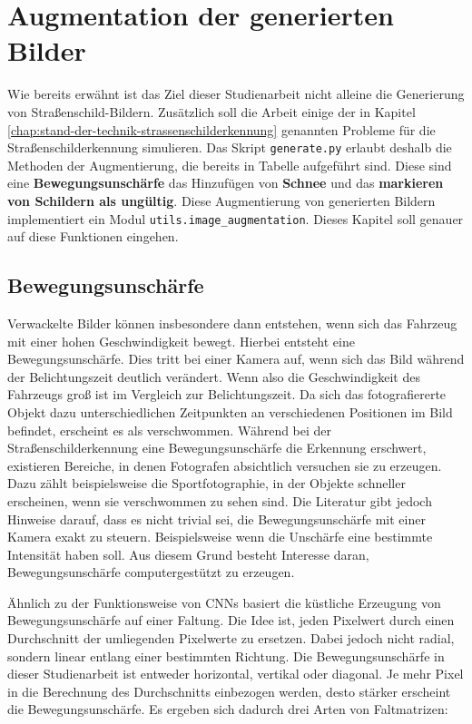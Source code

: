 \chapter{Augmentation der generierten Bilder}
\label{chap:5}

Wie bereits erwähnt ist das Ziel dieser Studienarbeit nicht alleine die Generierung von Straßenschild-Bildern. Zusätzlich soll die Arbeit einige der in Kapitel \ref{chap:stand-der-technik-strassenschilderkennung} genannten Probleme für die Straßenschilderkennung simulieren. Das Skript \texttt{generate.py} erlaubt deshalb die Methoden der Augmentierung, die bereits in Tabelle \label{tab:generate-cli} aufgeführt sind. Diese sind eine \textbf{Bewegungsunschärfe} das Hinzufügen von \textbf{Schnee} und das \textbf{markieren von Schildern als ungültig}. Diese Augmentierung von generierten Bildern implementiert ein Modul \texttt{utils.image_augmentation}. Dieses Kapitel soll genauer auf diese Funktionen eingehen.

\section{Bewegungsunschärfe}
Verwackelte Bilder können insbesondere dann entstehen, wenn sich das Fahrzeug mit einer hohen Geschwindigkeit bewegt. Hierbei entsteht eine Bewegungsunschärfe. Dies tritt bei einer Kamera auf, wenn sich das Bild während der Belichtungszeit deutlich verändert. Wenn also die Geschwindigkeit des Fahrzeugs groß ist im Vergleich zur Belichtungszeit. Da sich das fotografiererte Objekt dazu unterschiedlichen Zeitpunkten an verschiedenen Positionen im Bild befindet, erscheint es als verschwommen. Während bei der Straßenschilderkennung eine Bewegungsunschärfe die Erkennung erschwert, existieren Bereiche, in denen Fotografen absichtlich versuchen sie zu erzeugen. Dazu zählt beispielsweise die Sportfotographie, in der Objekte schneller erscheinen, wenn sie verschwommen zu sehen sind. Die Literatur gibt jedoch Hinweise darauf, dass es nicht trivial sei, die Bewegungsunschärfe mit einer Kamera exakt zu steuern. Beispielsweise wenn die Unschärfe eine bestimmte Intensität haben soll. Aus diesem Grund besteht Interesse daran, Bewegungsunschärfe computergestützt zu erzeugen. \cite{motion-blur}

Ähnlich zu der Funktionsweise von \acp{CNN} basiert die küstliche Erzeugung von Bewegungsunschärfe auf einer Faltung. Die Idee ist, jeden Pixelwert durch einen Durchschnitt der umliegenden Pixelwerte zu ersetzen. Dabei jedoch nicht radial, sondern linear entlang einer bestimmten Richtung. Die Bewegungsunschärfe in dieser Studienarbeit ist entweder horizontal, vertikal oder diagonal. Je mehr Pixel in die Berechnung des Durchschnitts einbezogen werden, desto stärker erscheint die Bewegungsunschärfe. Es ergeben sich dadurch drei Arten von Faltmatrizen: \cite{motion-blur}

